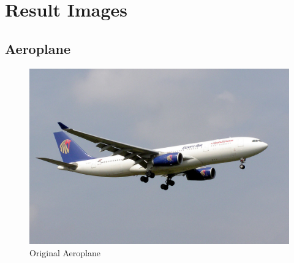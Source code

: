 \documentclass[12pt,a4paper]{report}
\begin{document}
\chapter{Result Images}
\section{Aeroplane}
\begin{figure}[!htb]
\includegraphics[width=1\linewidth]{test_img/aeroplane.png}
\caption{Original Aeroplane}
\end{figure}
\end{document}
